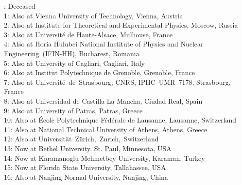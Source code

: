 \dag: Deceased\\
1: Also at Vienna University of Technology, Vienna, Austria \\
2: Also at Institute for Theoretical and Experimental Physics, Moscow, Russia \\
3: Also at Universit\'{e} de Haute-Alsace, Mulhouse, France \\
4: Also at Horia Hulubei National Institute of Physics and Nuclear Engineering~(IFIN-HH), Bucharest, Romania \\
5: Also at University of Cagliari, Cagliari, Italy \\
6: Also at Institut Polytechnique de Grenoble, Grenoble, France \\
7: Also at Universit\'{e}~de~Strasbourg, CNRS, IPHC~UMR~7178, Strasbourg, France \\
8: Also at Universidad de Castilla-La-Mancha, Ciudad Real, Spain 
\\
9: Also at University of Patras, Patras, Greece \\
10: Also at \'{E}cole Polytechnique F\'{e}d\'{e}rale de Lausanne, Lausanne, Switzerland \\
11: Also at National Technical University of Athens, Athens, Greece \\
12: Also at Universit\"{a}t~Z\"{u}rich,~Zurich,~Switzerland \\
13: Now at Bethel University, St. Paul, Minnesota, USA \\
14: Now at Karamanoglu Mehmetbey University, Karaman, Turkey \\
15: Now at Florida State University, Tallahassee, USA \\
16: Also at Nanjing Normal University, Nanjing, China